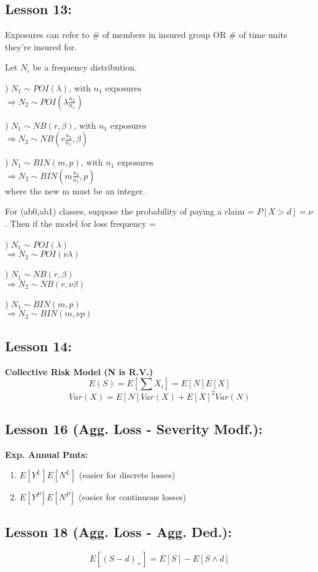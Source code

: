 \documentclass[11pt,twocolumn]{article}
\def\wl{\par \vspace{\baselineskip}}
\def\imply{\Rightarrow}
\begin{document}
\subsection*{Lesson 13:}
  Exposures can refer to \# of members in insured group
  OR \# of time units they're insured for.
  \wl\noindent
  Let $N_i$ be a frequency distribution. \wl{}) $ N_1 \sim POI(\lambda) \text{, with } n_1 \text{ exposures}$ \\
  $ \imply N_2 \sim POI(\lambda\frac{n_2}{n_1}) $
  \wl{}) $ N_1 \sim NB(r,\beta) \text{, with } n_1 \text{ exposures}$ \\
  $ \imply N_2 \sim NB(r\frac{n_2}{n_1},\beta) $
  \wl{}) $ N_1 \sim BIN(m,p) \text{, with } n_1 \text{ exposures}$ \\
  $ \imply N_2 \sim BIN(m\frac{n_2}{n_1},p) $\\ where the new m must be an integer.
  \wl\noindent
  For (ab0,ab1) classes, suppose the probability of paying a claim = $P[X>d] = \nu$.
  Then if the model for loss frequency = 
  \wl{}) $ N_1 \sim POI(\lambda) $ \\
  $ \imply N_2 \sim POI(\nu\lambda) $
  \wl{}) $ N_1 \sim NB(r,\beta)$ \\
  $ \imply N_2 \sim NB(r,\nu\beta) $
  \wl{}) $ N_1 \sim BIN(m,p)$ \\
  $ \imply N_2 \sim BIN(m,\nu p) $

\subsection*{Lesson 14:}
  \textbf{Collective Risk Model (N is R.V.)}\\
  \[ E(S) = E[\sum{X_i}] = E[N]E[X] \]
  \[ Var(X) = E[N]Var(X) + E[X]^2 Var(N) \]

\subsection*{Lesson 16 (Agg. Loss - Severity Modf.):}
  \textbf{Exp. Annual Pmts:}
  \begin{enumerate}
    \item $E[Y^L] E[N^L]$ (easier for discrete losses) \\
    \item $E[Y^P] E[N^P]$ (easier for continuous losses) \\
  \end{enumerate}

\subsection*{Lesson 18 (Agg. Loss - Agg. Ded.):}
  \[ E[(S-d)_+] = E[S] - E[S\wedge d] \]
\end{document}
